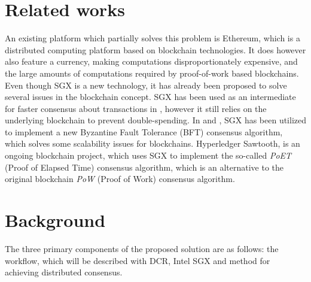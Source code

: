 \documentclass[12pt]{article}
\begin{document}
	\section{Related works}

	An existing platform which partially solves this problem is Ethereum\cite{ethereum-white-paper}, which is a distributed computing platform based on blockchain technologies.
	It does however also feature a currency, making computations disproportionately expensive, and the large amounts of computations required by proof-of-work based blockchains.
	Even though SGX is a new technology, it has already been proposed to solve several issues in the blockchain concept. 
	SGX has been used as an intermediate for faster consensus about transactions in \cite{improv-btc}, however it still relies on the underlying blockchain to prevent double-spending.
	In \cite{fastbft} and , SGX has been utilized to implement a new Byzantine Fault Tolerance (BFT) consensus algorithm, which solves some scalability issues for blockchains.
	Hyperledger Sawtooth, is an ongoing blockchain project, which uses SGX to implement the so-called \textit{PoET} (Proof of Elapsed Time) consensus algorithm, which is an alternative to the original blockchain \textit{PoW} (Proof of Work) consensus algorithm.

	\section{Background}

	The three primary components of the proposed solution are as follows: the workflow, which will be described with DCR, Intel SGX and method for achieving distributed consensus.




\end{document}
